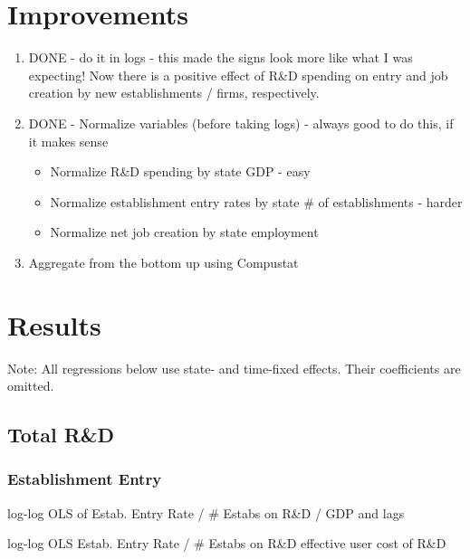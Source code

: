 \documentclass[7pt,english]{article}
\theoremstyle{remark}
\begin{document}
\section{Improvements}
\begin{enumerate}
	\item DONE - do it in logs - this made the signs look more like what I was expecting! Now there is a positive effect of R\&D spending on entry and job creation by new establishments / firms, respectively. 
	\item DONE - Normalize variables (before taking logs) - always good to do this, if it makes sense 
	\begin{itemize}
		\item Normalize R\&D spending by state GDP - easy
		\item Normalize establishment entry rates by state \# of establishments - harder
		\item Normalize net job creation by state employment
	\end{itemize}
	\item Aggregate from the bottom up using Compustat
\end{enumerate}


\section{Results}
Note: All regressions below use state- and time-fixed effects. Their coefficients are omitted. 
\subsection{Total R\&D}
\subsubsection{Establishment Entry}
\begin{table}[h!]
	\caption{log-log OLS of Estab. Entry Rate / \# Estabs on R\&D / GDP and lags}
	\center
	
\end{table}

\newpage
\begin{table}[h!]
	\caption{log-log OLS Estab. Entry Rate / \# Estabs on R\&D effective user cost of R\&D}
	\center
	
\end{table}
\end{document}
